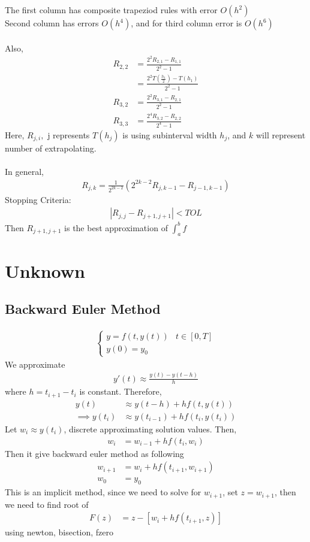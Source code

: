 \documentclass[11pt,oneside]{book}
\theoremstyle{break}
\theoremstyle{break}
\begin{document}
The first column has composite trapeziod rules with error $O(h^2)$\\
Second column has errors $O(h^4)$, and for third column error is $O(h^6)$\\
\hfill\\
 Also, \begin{align*}
R_{2,2}&=\frac{2^2R_{2,1}-R_{1,1}}{2^2-1}\\
&=\frac{2^{2}T\left(\frac{h_1}{2} \right)-T(h_1)}{2^2-1}\\
R_{3,2}&=\frac{2^2R_{3,1}-R_{2,1}}{2^2-1}\\
R_{3,3}&=\frac{2^4R_{3,2}-R_{2,2}}{2^4-1}
\end{align*} 
Here, $R_{j,i},$ j represents $T(h_j)$ is using subinterval width $h_j$, and $k$ will represent number of extrapolating.\\
\hfill\\
In general, \begin{align*}
R_{j,k}=\frac{1}{2^{2k-2}}\left(2^{2k-2}R_{j,k-1}-R_{j-1,k-1} \right)
\end{align*}
Stopping Criteria: \begin{align*}
|R_{j,j}-R_{j+1,j+1}|<TOL
\end{align*}
Then $R_{j+1,j+1}$ is the best approximation of $\int_{a}^{b}f$
\chapter[Unknown]{Unknown}
\section[Backward Euler Method]{Backward Euler Method}
\begin{align*}
\begin{cases}
y=f(t,y(t)) & t\in [0,T]\\
y(0)=y_0
\end{cases}
\end{align*}
We approximate \begin{align*}
y'(t)\approx \frac{y(t)-y(t-h)}{h}
\end{align*}
where $h=t_{i+1}-t_i$ is constant. Therefore, \begin{align*}
y(t)&\approx y(t-h)+hf(t,y(t))\\
\implies y(t_i)&\approx y(t_{i-1})+hf(t_i,y(t_i))
\end{align*}
Let $w_i\approx y(t_i)$, discrete approximating solution values. Then, \begin{align*}
w_i&=w_{i-1}+hf(t_i,w_i)
\end{align*}
Then it give backward euler method as following \begin{align*}
w_{i+1}&=w_i+hf(t_{i+1},w_{i+1})\\
w_0&=y_0
\end{align*}
This is an implicit method, since we need to solve for $w_{i+1}$, set $z=w_{i+1}$, then we need to find root of \begin{align*}
F(z)&=z-[w_i+hf(t_{i+1},z)]
\end{align*}
using newton, bisection, fzero
\end{document}
